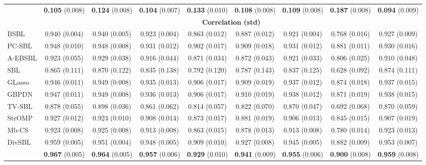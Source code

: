 \documentclass[lettersize,journal]{IEEEtran}
\theoremstyle{remark}
\begin{document}
\begin{table}[!t]
\begin{tabular}{lcccccccc}
			\rowcolor{customblue}{SPP-SBL}         & \textbf{0.105} (0.008) & \textbf{0.124} (0.008) & \textbf{0.104} (0.007) & \textbf{0.133} (0.010) & \textbf{0.108} (0.008) & \textbf{0.109} (0.008) & \textbf{0.187} (0.008) & \textbf{0.094} (0.009) \\
			\cmidrule(lr){2-9}
			& \multicolumn{8}{c}{\textbf{Correlation (std)}} \\
			\midrule
			{BSBL}           & 0.940 (0.004) & 0.940 (0.005) & 0.923 (0.004) & 0.863 (0.012) & 0.887 (0.012) & 0.921 (0.004) & 0.768 (0.016) & 0.927 (0.009) \\
			{PC-SBL}         & 0.948 (0.010) & 0.948 (0.008) & 0.931 (0.012) & 0.902 (0.017) & 0.909 (0.018) & 0.931 (0.012) & 0.881 (0.011) & 0.930 (0.016) \\
			{A-EBSBL}         & 0.923 (0.055) & 0.929 (0.038) & 0.916 (0.044) & 0.871 (0.034) & 0.872 (0.043) & 0.921 (0.033) & 0.806 (0.025) & 0.910 (0.048) \\
			{SBL}            & 0.865 (0.111) & 0.870 (0.122) & 0.835 (0.138) & 0.792 (0.120) & 0.787 (0.143) & 0.837 (0.125) & 0.628 (0.092) & 0.874 (0.111) \\
			{GLasso}    & 0.946 (0.011) & 0.949 (0.008) & 0.935 (0.013) & 0.906 (0.017) & 0.909 (0.019) & 0.937 (0.012) & 0.874 (0.018) & 0.937 (0.015) \\
			{GBPDN}     & 0.947 (0.011) & 0.949 (0.008) & 0.936 (0.013) & 0.906 (0.017) & 0.910 (0.019) & 0.938 (0.012) & 0.871 (0.019) & 0.938 (0.015) \\
			{TV-SBL}     & 0.878 (0.055) & 0.898 (0.036) & 0.861 (0.062) & 0.814 (0.057) & 0.822 (0.070) & 0.870 (0.047) & 0.692 (0.068) & 0.870 (0.059) \\
			{StrOMP}      & 0.927 (0.012) & 0.924 (0.010) & 0.908 (0.014) & 0.873 (0.017) & 0.881 (0.019) & 0.906 (0.013) & 0.845 (0.015) & 0.907 (0.019) \\
			Mb-CS      & 0.923 (0.008) & 0.925 (0.008) & 0.913 (0.008) & 0.863 (0.015) & 0.878 (0.013) & 0.913 (0.008) & 0.780 (0.014) & 0.923 (0.013) \\
			{DivSBL}         & 0.959 (0.005) & 0.951 (0.004) & 0.948 (0.005) & 0.909 (0.010) & 0.927 (0.008) & 0.945 (0.005) & 0.882 (0.009) & 0.953 (0.007) \\
			
			\rowcolor{customblue}{SPP-SBL}         & \textbf{0.967} (0.005) & \textbf{0.964} (0.005) & \textbf{0.957} (0.006) & \textbf{0.929} (0.010) & \textbf{0.941} (0.009) & \textbf{0.955} (0.006) & \textbf{0.900} (0.008) & \textbf{0.959} (0.008) \\
			\bottomrule
		\end{tabular}
\end{table}
\end{document}
